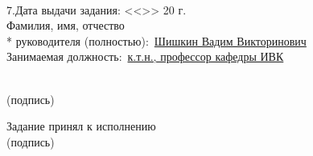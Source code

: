 \begin{titlepage}
\noindent \underline{\hspace{\textwidth}}
\noindent \underline{\hspace{\textwidth}}
\noindent \underline{\hspace{\textwidth}}
\noindent \underline{\hspace{\textwidth}}\\

\noindent 7.Дата выдачи задания: <<\underline{\hspace{1cm}}>>\underline{\hspace{3.5cm}} 20\underline{\hspace{0.8cm}} г.\\

\noindent Фамилия, имя, отчество\\*
руководителя (полностью):~\uline{Шишкин Вадим Викторинович\hfill}\\
\noindent Занимаемая должность:~\uline{к.т.н., профессор кафедры ИВК\hfill}
\begin{flushright}
  \underline{\hspace{5cm}}\\
  \small
  (подпись)\hspace*{1.5cm}
  \normalsize
\end{flushright}


\noindent Задание принял к исполнению~\uline{\hfill}\\
\hspace*{11.5cm}
\small
(подпись)
\normalsize
\end{titlepage}
